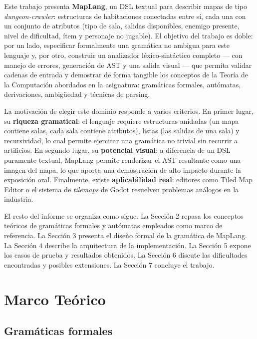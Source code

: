 \documentclass[10pt,twocolumn]{article}
\begin{document}
Este trabajo presenta \textbf{MapLang}, un DSL textual para describir mapas
de tipo \textit{dungeon-crawler}: estructuras de habitaciones conectadas
entre sí, cada una con un conjunto de atributos (tipo de sala, salidas
disponibles, enemigo presente, nivel de dificultad, ítem y personaje no
jugable). El objetivo del trabajo es doble: por un lado, especificar
formalmente una gramática no ambigua para este lenguaje y, por otro,
construir un analizador léxico-sintáctico completo --- con manejo de
errores, generación de AST y una salida visual --- que permita validar
cadenas de entrada y demostrar de forma tangible los conceptos de la
Teoría de la Computación abordados en la asignatura: gramáticas formales,
autómatas, derivaciones, ambigüedad y técnicas de parsing.

La motivación de elegir este dominio responde a varios criterios. En
primer lugar, su \textbf{riqueza gramatical}: el lenguaje requiere
estructuras anidadas (un mapa contiene salas, cada sala contiene
atributos), listas (las salidas de una sala) y recursividad, lo cual
permite ejercitar una gramática no trivial sin recurrir a artificios. En
segundo lugar, su \textbf{potencial visual}: a diferencia de un DSL
puramente textual, MapLang permite renderizar el AST resultante como una
imagen del mapa, lo que aporta una demostración de alto impacto durante la
exposición oral. Finalmente, existe \textbf{aplicabilidad real}: editores
como Tiled Map Editor o el sistema de \textit{tilemaps} de Godot resuelven
problemas análogos en la industria.

El resto del informe se organiza como sigue. La Sección 2 repasa los
conceptos teóricos de gramáticas formales y autómatas empleados como marco
de referencia. La Sección 3 presenta el diseño formal de la gramática de
MapLang. La Sección 4 describe la arquitectura de la implementación. La
Sección 5 expone los casos de prueba y resultados obtenidos. La Sección 6
discute las dificultades encontradas y posibles extensiones. La Sección 7
concluye el trabajo.

\section{Marco Teórico}

\subsection{Gramáticas formales}
\end{document}

